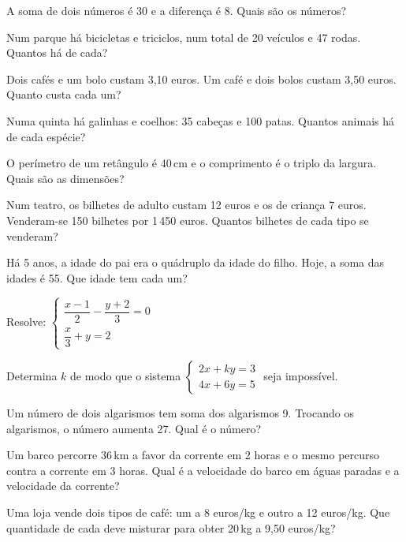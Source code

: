\documentclass[12pt]{article}
\begin{document}
\begin{exercicios}
  \item A soma de dois números é 30 e a diferença é 8. Quais são os números?
  \item Num parque há bicicletas e triciclos, num total de 20 veículos e 47 rodas. Quantos há de cada?
  \item Dois cafés e um bolo custam 3,10 euros. Um café e dois bolos custam 3,50 euros. Quanto custa cada um?
  \item Numa quinta há galinhas e coelhos: 35 cabeças e 100 patas. Quantos animais há de cada espécie?
  \item O perímetro de um retângulo é 40\,cm e o comprimento é o triplo da largura. Quais são as dimensões?
  \item Num teatro, os bilhetes de adulto custam 12 euros e os de criança 7 euros. Venderam-se 150 bilhetes por 1\,450 euros. Quantos bilhetes de cada tipo se venderam?
  \item Há 5 anos, a idade do pai era o quádruplo da idade do filho. Hoje, a soma das idades é 55. Que idade tem cada um?
\end{exercicios}

\begin{exercicios}
  \item Resolve: $\begin{cases} \dfrac{x - 1}{2} - \dfrac{y + 2}{3} = 0 \\[6pt] \dfrac{x}{3} + y = 2 \end{cases}$
  \item Determina $k$ de modo que o sistema $\begin{cases} 2x + ky = 3 \\ 4x + 6y = 5 \end{cases}$ seja impossível.
  \item Um número de dois algarismos tem soma dos algarismos 9. Trocando os algarismos, o número aumenta 27. Qual é o número?
  \item Um barco percorre 36\,km a favor da corrente em 2 horas e o mesmo percurso contra a corrente em 3 horas. Qual é a velocidade do barco em águas paradas e a velocidade da corrente?
  \item Uma loja vende dois tipos de café: um a 8 euros/kg e outro a 12 euros/kg. Que quantidade de cada deve misturar para obter 20\,kg a 9,50 euros/kg?
\end{exercicios}
\end{document}
